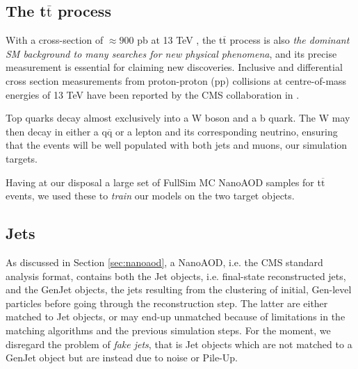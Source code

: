 \subsection{The t$\overline{\text{t}}$ process}
With a cross-section of $\approx 900$ pb at 13 TeV , the t$\overline{\text{t}}$ process is also \emph{the dominant SM background to many searches for new
physical phenomena}, and its precise measurement is essential for claiming new discoveries.
Inclusive and differential cross section measurements from
proton-proton (pp) collisions at centre-of-mass energies of 13 TeV have been reported by
the CMS collaboration in \cite{Sirunyan_2017}.


Top quarks decay almost exclusively into a W boson and a b quark. The W may then decay in either a q$\overline{\text{q}}$ or a lepton and its corresponding neutrino, ensuring that the events will be well populated with both jets and muons, our simulation targets. 


Having at our disposal a large set of FullSim MC NanoAOD samples for t$\overline{\text{t}}$ events, we used these to \emph{train} our models on the two target objects.

\subsection{Jets}

As discussed in Section \ref{sec:nanoaod}, a NanoAOD, i.e. the CMS standard analysis format, contains both the Jet objects, i.e. final-state reconstructed jets, and the GenJet objects, the jets resulting from the clustering of initial, Gen-level particles before going through the reconstruction step. The latter are either matched to Jet objects, or may end-up unmatched because of limitations in the matching algorithms and the previous simulation steps. For the moment, we disregard the problem of \emph{fake jets}, that is Jet objects which are not matched to a GenJet object but are instead due to noise or Pile-Up.

